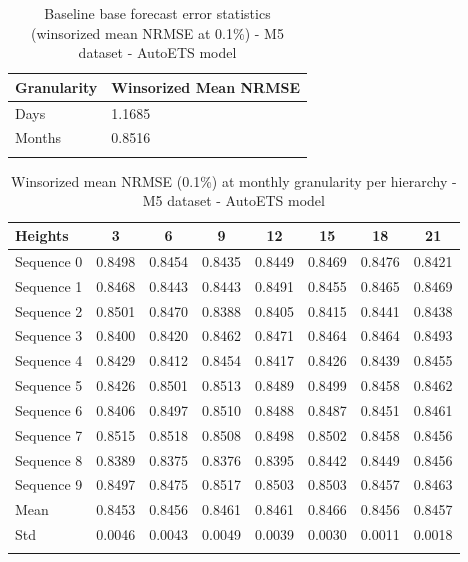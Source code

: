 \begin{table}[h]
\caption{Baseline base forecast error statistics (winsorized mean NRMSE at 0.1\%) - M5 dataset - AutoETS model}\label{tab:baseline_M5_AutoETS}
\begin{tabular}{@{}ll@{}}
\toprule
Granularity & Winsorized Mean NRMSE \\
\midrule
Days & 1.1685 \\
Months & 0.8516 \\
\botrule
\end{tabular}
\end{table}

\begin{table}[h]
\caption{Winsorized mean NRMSE (0.1\%) at monthly granularity per hierarchy - M5 dataset - AutoETS model}\label{tab:month_mean_M5_AutoETS}
\begin{tabular*}{\textwidth}{@{\extracolsep\fill}lccccccc}
\toprule
Heights & 3 & 6 & 9 & 12 & 15 & 18 & 21 \\
\midrule
Sequence 0 & 0.8498 & 0.8454 & 0.8435 & 0.8449 & 0.8469 & 0.8476 & 0.8421 \\
Sequence 1 & 0.8468 & 0.8443 & 0.8443 & 0.8491 & 0.8455 & 0.8465 & 0.8469 \\
Sequence 2 & 0.8501 & 0.8470 & 0.8388 & 0.8405 & 0.8415 & 0.8441 & 0.8438 \\
Sequence 3 & 0.8400 & 0.8420 & 0.8462 & 0.8471 & 0.8464 & 0.8464 & 0.8493 \\
Sequence 4 & 0.8429 & 0.8412 & 0.8454 & 0.8417 & 0.8426 & 0.8439 & 0.8455 \\
Sequence 5 & 0.8426 & 0.8501 & 0.8513 & 0.8489 & 0.8499 & 0.8458 & 0.8462 \\
Sequence 6 & 0.8406 & 0.8497 & 0.8510 & 0.8488 & 0.8487 & 0.8451 & 0.8461 \\
Sequence 7 & 0.8515 & 0.8518 & 0.8508 & 0.8498 & 0.8502 & 0.8458 & 0.8456 \\
Sequence 8 & 0.8389 & 0.8375 & 0.8376 & 0.8395 & 0.8442 & 0.8449 & 0.8456 \\
Sequence 9 & 0.8497 & 0.8475 & 0.8517 & 0.8503 & 0.8503 & 0.8457 & 0.8463 \\
\midrule
Mean & 0.8453 & 0.8456 & 0.8461 & 0.8461 & 0.8466 & 0.8456 & 0.8457 \\
Std & 0.0046 & 0.0043 & 0.0049 & 0.0039 & 0.0030 & 0.0011 & 0.0018 \\
\botrule
\end{tabular*}
\end{table}

